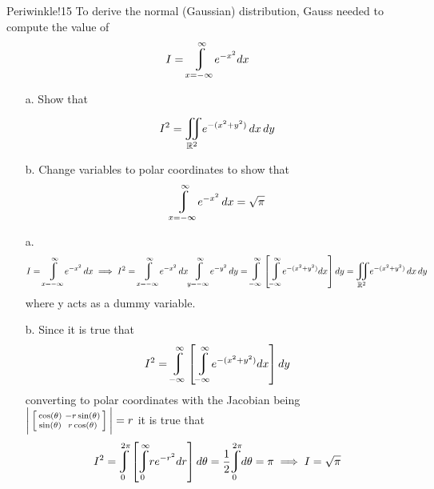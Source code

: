 \documentclass[titlepage]{article}
\begin{document}
\begin{cproblem}{4}{Periwinkle!15}
To derive the normal (Gaussian) distribution, Gauss needed to compute the value of
$$I = \mlvarint\limits_{x=-\infty}^{\infty} e^{-x^2}dx$$
\begin{itemize}
\item[a.] Show that
$$I^2 = \bigiint{\R^2}\, e^{-(x^2 + y^2)}\,dx\,dy$$
\item[b.] Change variables to polar coordinates to show that
$$\mlvarint\limits_{x=-\infty}^{\infty} e^{-x^2}\,dx = \sqrt{\pi}$$
\end{itemize} 
\end{cproblem}
\begin{solution}
\begin{itemize}
\item[a.]
$$I = \mlvarint\limits_{x=-\infty}^{\infty} e^{-x^2}\,dx\implies I^2 =\mlvarint\limits_{x=-\infty}^{\infty} e^{-x^2}\,dx \mlvarint\limits_{y=-\infty}^{\infty} e^{-y^2}\,dy = \mlvarint\limits_{-\infty}^{\infty}\left[\mlvarint\limits_{-\infty}^{\infty} e^{-(x^2 + y^2)}dx\right]dy = \bigiint{\R^2}\, e^{-(x^2 + y^2)}\,dx\,dy$$
where y acts as a dummy variable.
\item[b.] Since it is true that
$$I^2 = \mlvarint\limits_{-\infty}^{\infty}\left[\mlvarint\limits_{-\infty}^{\infty} e^{-(x^2 + y^2)}dx\right]dy$$
converting to polar coordinates with the Jacobian being $\bigg|\left[\begin{smallmatrix}\cos(\theta) & -r\sin(\theta) \\ \sin(\theta) & r\cos(\theta)\end{smallmatrix}\right]\bigg| = r$ it is true that
$$I^2 = \mlvarint\limits_{0}^{2\pi}\left[\mlvarint\limits_{0}^{\infty} r e^{-r^2}dr\right]d\theta = \frac{1}{2}\mlvarint\limits_{0}^{2\pi}d\theta = \pi \implies I = \sqrt{\pi}$$
\end{itemize}
\end{solution}
\end{document}
